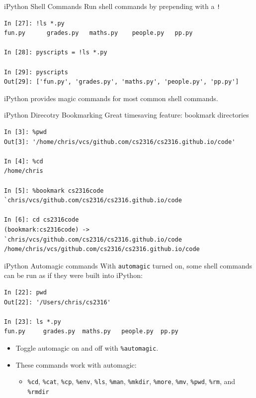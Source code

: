 \documentclass[smaller, aspectratio=1610]{beamer}
\begin{document}
\begin{frame}[label={sec:orgbd628ed},fragile]{iPython Shell Commands}
 Run shell commands by prepending with a \texttt{!}

\lstset{language=sh,label= ,caption= ,captionpos=b,numbers=none}
\begin{lstlisting}
In [27]: !ls *.py
fun.py		grades.py	maths.py	people.py	pp.py

In [28]: pyscripts = !ls *.py

In [29]: pyscripts
Out[29]: ['fun.py', 'grades.py', 'maths.py', 'people.py', 'pp.py']
\end{lstlisting}

iPython provides magic commands for most common shell commands.
\end{frame}


\begin{frame}[label={sec:org51036d7},fragile]{iPython Direcotry Bookmarking}
 Great timesaving feature: bookmark directories

\lstset{language=sh,label= ,caption= ,captionpos=b,numbers=none}
\begin{lstlisting}
In [3]: %pwd
Out[3]: '/home/chris/vcs/github.com/cs2316/cs2316.github.io/code'

In [4]: %cd
/home/chris

In [5]: %bookmark cs2316code `chris/vcs/github.com/cs2316/cs2316.github.io/code

In [6]: cd cs2316code
(bookmark:cs2316code) -> `chris/vcs/github.com/cs2316/cs2316.github.io/code
/home/chris/vcs/github.com/cs2316/cs2316.github.io/code
\end{lstlisting}
\end{frame}

\begin{frame}[label={sec:org0eaee52},fragile]{iPython Automagic commands}
 With \texttt{automagic} turned on, some shell commands can be run as if they were built into iPython:

\lstset{language=sh,label= ,caption= ,captionpos=b,numbers=none}
\begin{lstlisting}
In [22]: pwd
Out[22]: '/Users/chris/cs2316'

In [23]: ls *.py
fun.py     grades.py  maths.py   people.py  pp.py
\end{lstlisting}

\begin{itemize}
\item Toggle automagic on and off with \texttt{\%automagic}.

\item These commands work with automagic:

\begin{itemize}
\item \texttt{\%cd}, \texttt{\%cat}, \texttt{\%cp}, \texttt{\%env}, \texttt{\%ls}, \texttt{\%man}, \texttt{\%mkdir}, \texttt{\%more}, \texttt{\%mv}, \texttt{\%pwd}, \texttt{\%rm},  and \texttt{\%rmdir}
\end{itemize}
\end{itemize}
\end{frame}
\end{document}
